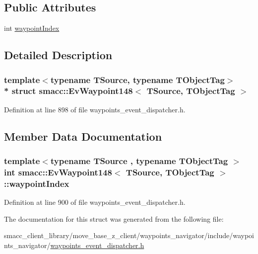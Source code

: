 \subsection*{Public Attributes}
\begin{DoxyCompactItemize}
\item 
int \hyperlink{structsmacc_1_1EvWaypoint148_a5b17af4641e155ce38556e0e0bb3e525}{waypoint\+Index}
\end{DoxyCompactItemize}


\subsection{Detailed Description}
\subsubsection*{template$<$typename T\+Source, typename T\+Object\+Tag$>$\\*
struct smacc\+::\+Ev\+Waypoint148$<$ T\+Source, T\+Object\+Tag $>$}



Definition at line 898 of file waypoints\+\_\+event\+\_\+dispatcher.\+h.



\subsection{Member Data Documentation}
\subsubsection[{\texorpdfstring{waypoint\+Index}{waypointIndex}}]{\setlength{\rightskip}{0pt plus 5cm}template$<$typename T\+Source , typename T\+Object\+Tag $>$ int {\bf smacc\+::\+Ev\+Waypoint148}$<$ T\+Source, T\+Object\+Tag $>$\+::waypoint\+Index}\hypertarget{structsmacc_1_1EvWaypoint148_a5b17af4641e155ce38556e0e0bb3e525}{}\label{structsmacc_1_1EvWaypoint148_a5b17af4641e155ce38556e0e0bb3e525}


Definition at line 900 of file waypoints\+\_\+event\+\_\+dispatcher.\+h.



The documentation for this struct was generated from the following file\+:\begin{DoxyCompactItemize}
\item 
smacc\+\_\+client\+\_\+library/move\+\_\+base\+\_\+z\+\_\+client/waypoints\+\_\+navigator/include/waypoints\+\_\+navigator/\hyperlink{waypoints__event__dispatcher_8h}{waypoints\+\_\+event\+\_\+dispatcher.\+h}\end{DoxyCompactItemize}
